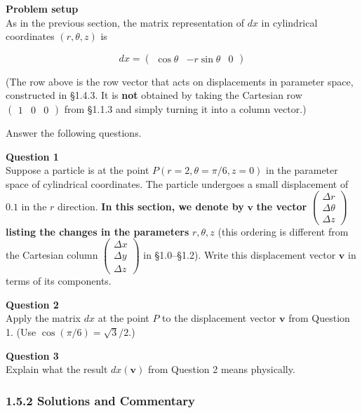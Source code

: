 \textbf{Problem setup}\\
As in the previous section, the matrix representation of \(dx\) in
cylindrical coordinates \((r,\theta,z)\) is

\[
dx = \begin{pmatrix} \cos\theta & -r\sin\theta & 0 \end{pmatrix}
\]

(The row above is the row vector that acts on displacements in parameter
space, constructed in §1.4.3. It is \textbf{not} obtained by taking the
Cartesian row \(\begin{pmatrix}1&0&0\end{pmatrix}\) from §1.1.3 and
simply turning it into a column vector.)

Answer the following questions.

\textbf{Question 1}\\
Suppose a particle is at the point \(P(r=2,\theta=\pi/6,z=0)\) in the
parameter space of cylindrical coordinates. The particle undergoes a
small displacement of \(0.1\) in the \(r\) direction. \textbf{In this
section, we denote by} \(\mathbf{v}\) \textbf{the vector}
\(\begin{pmatrix}\Delta r\\\Delta\theta\\\Delta z\end{pmatrix}\)
\textbf{listing the changes in the parameters} \(r,\theta,z\) (this
ordering is different from the Cartesian column
\(\begin{pmatrix}\Delta x\\\Delta y\\\Delta z\end{pmatrix}\) in
§1.0--§1.2). Write this displacement vector \(\mathbf{v}\) in terms of
its components.

\textbf{Question 2}\\
Apply the matrix \(dx\) at the point \(P\) to the displacement vector
\(\mathbf{v}\) from Question 1. (Use \(\cos(\pi/6)=\sqrt{3}/2\).)

\textbf{Question 3}\\
Explain what the result \(dx(\mathbf{v})\) from Question 2 means
physically.

\hypertarget{solutions-and-commentary}{%
\subsubsection{1.5.2 Solutions and
Commentary}\label{solutions-and-commentary}}

